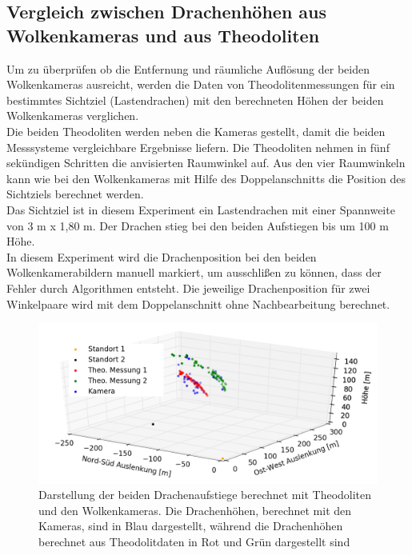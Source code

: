 \documentclass[a4paper,11pt,twoside,german]{article}
\begin{document}
\subsection{Vergleich zwischen Drachenhöhen aus Wolkenkameras und aus Theodoliten}
\label{SECDragon}
Um zu überprüfen ob die Entfernung und räumliche Auflösung der beiden Wolkenkameras ausreicht, werden die Daten von Theodolitenmessungen für ein bestimmtes Sichtziel (Lastendrachen) mit den berechneten Höhen der beiden Wolkenkameras verglichen.\\
Die beiden Theodoliten werden neben die Kameras gestellt, damit die beiden Messsysteme vergleichbare Ergebnisse liefern. Die Theodoliten nehmen in fünf sekündigen Schritten die anvisierten Raumwinkel auf. Aus den vier Raumwinkeln kann wie bei den Wolkenkameras mit Hilfe des Doppelanschnitts die Position des Sichtziels berechnet werden.\\
Das Sichtziel ist in diesem Experiment ein Lastendrachen mit einer Spannweite von 3 m x 1,80 m. Der Drachen stieg bei den beiden Aufstiegen bis um 100 m Höhe.\\
In diesem Experiment wird die Drachenposition bei den beiden Wolkenkamerabildern manuell markiert, um ausschlißen zu können, dass der Fehler durch Algorithmen entsteht. Die jeweilige Drachenposition für zwei Winkelpaare wird mit dem Doppelanschnitt ohne Nachbearbeitung berechnet.\\
\begin{figure}[h]
	\begin{center}
		\includegraphics[width=1\textwidth]{media/dragon_theo.png}
		\caption[Drachenaufstieg]{Darstellung der beiden Drachenaufstiege berechnet mit Theodoliten und den Wolkenkameras.  Die Drachenhöhen, berechnet mit den Kameras, sind in Blau dargestellt, während die Drachenhöhen berechnet aus Theodolitdaten in Rot und Grün dargestellt sind}
		\label{FIGTheoDragon}
	\end{center}
\end{figure}
\end{document}

